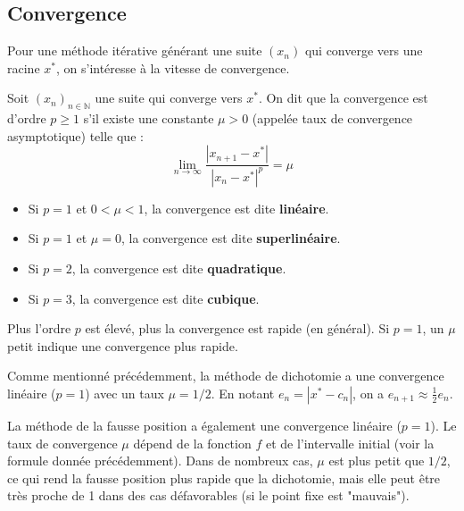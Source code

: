 
\subsection{Convergence}
Pour une méthode itérative générant une suite $(x_n)$ qui converge vers une racine $x^*$, on s'intéresse à la vitesse de convergence.

\begin{definition}
Soit $(x_n)_{n \in \mathbb{N}}$ une suite qui converge vers $x^*$. On dit que la convergence est d'ordre $p \ge 1$ s'il existe une constante $\mu > 0$ (appelée taux de convergence asymptotique) telle que :
\[ \lim_{n\to\infty} \frac{|x_{n+1}-x^*|}{|x_n-x^*|^p} = \mu \]
\begin{itemize}
    \item Si $p=1$ et $0 < \mu < 1$, la convergence est dite \textbf{linéaire}.
    \item Si $p=1$ et $\mu=0$, la convergence est dite \textbf{superlinéaire}.
    \item Si $p=2$, la convergence est dite \textbf{quadratique}.
    \item Si $p=3$, la convergence est dite \textbf{cubique}.
\end{itemize}
Plus l'ordre $p$ est élevé, plus la convergence est rapide (en général). Si $p=1$, un $\mu$ petit indique une convergence plus rapide.
\end{definition}

\begin{example}
Comme mentionné précédemment, la méthode de dichotomie a une convergence linéaire ($p=1$) avec un taux $\mu = 1/2$. En notant $e_n = |x^* - c_n|$, on a $e_{n+1} \approx \frac{1}{2} e_n$.
\end{example}

\begin{example}
La méthode de la fausse position a également une convergence linéaire ($p=1$). Le taux de convergence $\mu$ dépend de la fonction $f$ et de l'intervalle initial (voir la formule donnée précédemment). Dans de nombreux cas, $\mu$ est plus petit que $1/2$, ce qui rend la fausse position plus rapide que la dichotomie, mais elle peut être très proche de 1 dans des cas défavorables (si le point fixe est "mauvais").
\end{example}

